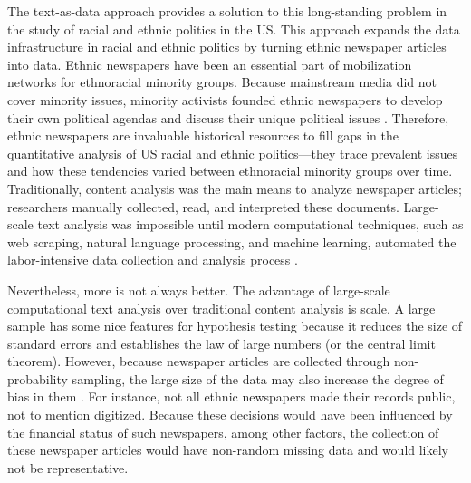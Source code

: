 The text-as-data approach provides a solution to this long-standing problem in the study of racial and ethnic politics in the US. This approach expands the data infrastructure in racial and ethnic politics by turning ethnic newspaper articles into data. Ethnic newspapers have been an essential part of mobilization networks for ethnoracial minority groups. Because mainstream media did not cover minority issues, minority activists founded ethnic newspapers to develop their own political agendas and discuss their unique political issues \citep{le1992asian, dawson1994black, rodriguez1999making, dawson2001black, kannegaard2008press, harris2010barbershops}. Therefore, ethnic newspapers are invaluable historical resources to fill gaps in the quantitative analysis of US racial and ethnic politics---they trace prevalent issues and how these tendencies varied between ethnoracial minority groups over time. Traditionally, content analysis was the main means to analyze newspaper articles; researchers manually collected, read, and interpreted these documents. Large-scale text analysis was impossible until modern computational techniques, such as web scraping, natural language processing, and machine learning, automated the labor-intensive data collection and analysis process \cite{grimmer2013text, wilkerson2017large}.

Nevertheless, more is not always better. The advantage of large-scale computational text analysis over traditional content analysis is scale. A large sample has some nice features for hypothesis testing because it reduces the size of standard errors and establishes the law of large numbers (or the central limit theorem). However, because newspaper articles are collected through non-probability sampling, the large size of the data may also increase the degree of bias in them \citep[685-688]{meng2018statistical}. For instance, not all ethnic newspapers made their records public, not to mention digitized. Because these decisions would have been influenced by the financial status of such newspapers, among other factors, the collection of these newspaper articles would have non-random missing data and would likely not be representative. 

